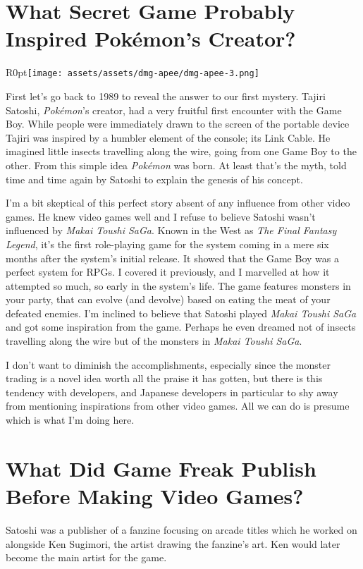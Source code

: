 \documentclass{book}
\begin{document}
\FloatBarrier\section*{What Secret Game Probably Inspired Pokémon’s Creator?}
\begin{wrapfigure}{R}{0pt}{\texttt{[image: assets/assets/dmg-apee/dmg-apee-3.png]}}\end{wrapfigure}
First let’s go back to 1989 to reveal the answer to our first mystery. Tajiri Satoshi, \emph{Pokémon}’s creator, had a very fruitful first encounter with the Game Boy. While people were immediately drawn to the screen of the portable device Tajiri was inspired by a humbler element of the console; its Link Cable. He imagined little insects travelling along the wire, going from one Game Boy to the other. From this simple idea \emph{Pokémon} was born. At least that’s the myth, told time and time again by Satoshi to explain the genesis of his concept.\par
I’m a bit skeptical of this perfect story absent of any influence from other video games. He knew video games well and I refuse to believe Satoshi wasn’t influenced by \emph{Makai Toushi SaGa}. Known in the West as \emph{The Final Fantasy Legend}, it’s the first role-playing game for the system coming in a mere six months after the system’s initial release. It showed that the Game Boy was a perfect system for RPGs. I covered it previously, and I marvelled at how it attempted so much, so early in the system’s life. The game features monsters in your party, that can evolve (and devolve) based on eating the meat of your defeated enemies. I’m inclined to believe that Satoshi played \emph{Makai Toushi SaGa} and got some inspiration from the game. Perhaps he even dreamed not of insects travelling along the wire but of the monsters in \emph{Makai Toushi SaGa}.\par
I don’t want to diminish the accomplishments, especially since the monster trading is a novel idea worth all the praise it has gotten, but there is this tendency with developers, and Japanese developers in particular to shy away from mentioning inspirations from other video games. All we can do is presume which is what I’m doing here.\par
\FloatBarrier\section*{What Did Game Freak Publish Before Making Video Games?}
Satoshi was a publisher of a fanzine focusing on arcade titles which he worked on alongside Ken Sugimori, the artist drawing the fanzine’s art. Ken would later become the main artist for the game.\par
\end{document}
